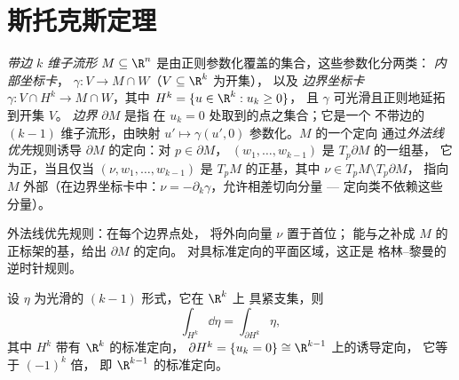 \section{斯托克斯定理}

\begin{definition}\label{def:b3:forms:boundary}
\emph{带边 $k$ 维子流形}
$M \subseteq \R^n$ 是由正则参数化覆盖的集合，这些参数化分两类：
\emph{内部坐标卡}，
$\gamma\colon V \to M \cap W$（$V \subseteq \R^k$ 为开集），
以及 \emph{边界坐标卡} $\gamma\colon V \cap H^k \to M
\cap W$，其中 $H^k = \{u \in \R^k : u_k \geq 0\}$，
且 $\gamma$ 可光滑且正则地延拓到开集 $V$。
\emph{边界} $\partial M$ 是指
在 $u_k = 0$ 处取到的点之集合；它是一个
不带边的 $(k-1)$ 维子流形，由映射 $u' \mapsto \gamma(u',
0)$ 参数化。$M$ 的一个定向
通过\emph{外法线优先}规则诱导 $\partial M$ 的定向：对 $p \in \partial M$，
$(w_1, \dots, w_{k-1})$ 是 $T_p\partial M$ 的一组基，
它为正，当且仅当 $(\nu, w_1, \dots, w_{k-1})$ 是
$T_pM$ 的正基，其中 $\nu \in T_pM \setminus T_p\partial M$，
指向 $M$ 外部（在边界坐标卡中：$\nu =
-\partial_k\gamma$，允许相差切向分量 ---
定向类不依赖这些分量）。
\end{definition}

\begin{omfigure}

{\small 外法线优先规则：在每个边界点处，
将外向向量 $\nu$ 置于首位；
能与之补成 $M$ 的正标架的基，给出 $\partial M$ 的定向。
对具标准定向的平面区域，这正是
格林–黎曼的逆时针规则。}
\end{omfigure}

\begin{lemma}[半空间上的斯托克斯定理]
\label{lem:b3:forms:halfspace}
设 $\eta$ 为光滑的 $(k-1)$ 形式，它在 $\R^k$ 上
具紧支集，则
\[
\int_{H^k}\dd\eta = \int_{\partial H^k}\eta,
\]
其中 $H^k$ 带有 $\R^k$ 的标准定向，
$\partial H^k = \{u_k = 0\} \cong \R^{k-1}$ 上的诱导定向，
它等于 $(-1)^k$ 倍，
即 $\R^{k-1}$ 的标准定向。
\end{lemma}

